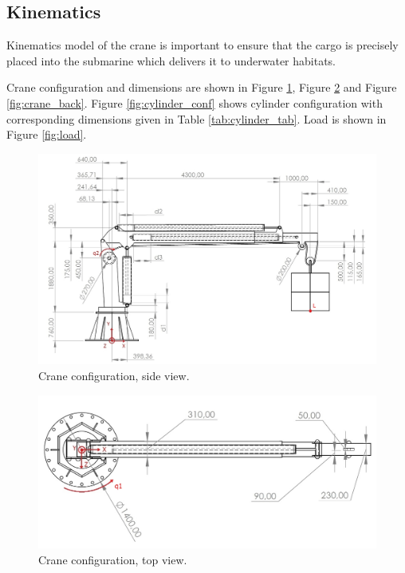 \documentclass{article}
\begin{document}
	\subsection{Kinematics}

	Kinematics model of the crane is important to ensure that the cargo is 
	precisely placed into the submarine which delivers it to underwater 
	habitats.
	
	Crane configuration and dimensions are shown in Figure \ref{fig:crane_side}, Figure \ref{fig:crane_top} and Figure \ref{fig:crane_back}. Figure \ref{fig:cylinder_conf} shows cylinder configuration with corresponding dimensions given in Table \ref{tab:cylinder_tab}. Load is shown in Figure \ref{fig:load}.
	
	\begin{figure}[h!]
		\centering
		\includegraphics[width=\textwidth]{kran_bokocrt.jpg}
		\caption{Crane configuration, side view.}
		\label{fig:crane_side}
	\end{figure}
	
	\begin{figure}[h!]
		\centering
		\includegraphics[width=\textwidth]{kran_tlocrt.jpg}
		\caption{Crane configuration, top view.}
		\label{fig:crane_top}
	\end{figure}
	
\end{document}
